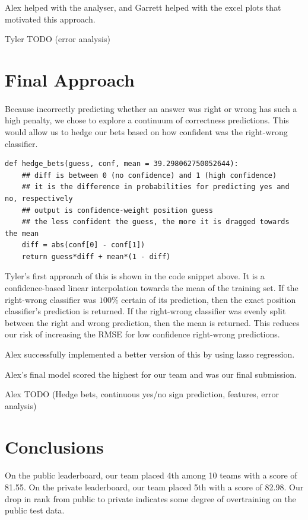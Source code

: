 \documentclass[letterpaper]{article}
\begin{document}
Alex helped with the analyser, and Garrett helped with the excel plots that motivated this approach.

Tyler TODO (error analysis)

\section*{Final Approach}

\paragraph{} Because incorrectly predicting whether an answer was right or wrong has such a high penalty, we chose to explore a continuum of correctness predictions. This would allow us to hedge our bets based on how confident was the right-wrong classifier.

\begin{verbatim}
def hedge_bets(guess, conf, mean = 39.298062750052644):
    ## diff is between 0 (no confidence) and 1 (high confidence)
    ## it is the difference in probabilities for predicting yes and no, respectively
    ## output is confidence-weight position guess
    ## the less confident the guess, the more it is dragged towards the mean
    diff = abs(conf[0] - conf[1]) 
    return guess*diff + mean*(1 - diff)
\end{verbatim}

Tyler's first approach of this is shown in the code snippet above. It is a confidence-based linear interpolation towards the mean of the training set. If the right-wrong classifier was $100\%$ certain of its prediction, then the exact position classifier's prediction is returned. If the right-wrong classifier was evenly split between the right and wrong prediction, then the mean is returned. This reduces our risk of increasing the RMSE for low confidence right-wrong predictions.

Alex successfully implemented a better version of this by using lasso regression.

Alex's final model scored the highest for our team and was our final submission.

Alex TODO (Hedge bets, continuous yes/no sign prediction, features, error analysis)

\section*{Conclusions}

\paragraph{} On the public leaderboard, our team placed 4th among 10 teams with a score of 81.55. On the private leaderboard, our team placed 5th with a score of 82.98. Our drop in rank from public to private indicates some degree of overtraining on the public test data.
\end{document}
